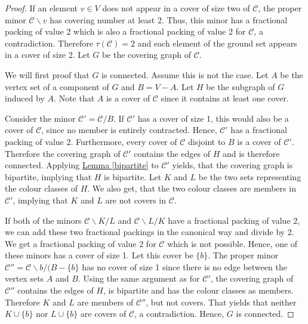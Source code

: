 \documentclass[a4paper, 12pt, twoside=false]{scrbook}
\theoremstyle{definition}
\begin{document}
   \begin{proof}
       If an element $v \in V$ does not appear in a cover of size two of $\mathcal{C}$, the proper minor $\mathcal{C} \backslash v$ has covering number at least 2.
       Thus, this minor has a fractional packing of value 2 which is also a fractional packing of value 2 for $\mathcal{C}$, a contradiction.
       Therefore $\tau(\mathcal{C}) = 2$ and each element of the ground set appears in a cover of size 2.
       Let $G$ be the covering graph of $\mathcal{C}$.

       We will first proof that $G$ is connected.
       Assume this is not the case.
       Let $A$ be the vertex set of a component of $G$ and $B = V - A$.
       Let $H$ be the subgraph of $G$ induced by $A$.
       Note that $A$ is a cover of $\mathcal{C}$ since it contains at least one cover.

       Consider the minor $\mathcal{C'}=\mathcal{C}/B$.
       If $\mathcal{C'}$ has a cover of size 1, this would also be a cover of $\mathcal{C}$, since no member is entirely contracted.
       Hence, $\mathcal{C'}$ has a fractional packing of value 2.
       Furthermore, every cover of $\mathcal{C}$ disjoint to $B$ is a cover of $\mathcal{C'}$.
       Therefore the covering graph of $\mathcal{C'}$ contains the edges of $H$ and is therefore connected.
       Applying \hyperref[bipartite]{Lemma \ref*{bipartite}} to $\mathcal{C'}$ yields, that the covering graph is bipartite, implying that $H$ is bipartite.
       Let $K$ and $L$ be the two sets representing the colour classes of $H$.
       We also get, that the two colour classes are members in $\mathcal{C'}$, implying that $K$ and $L$ are not covers in $\mathcal{C}$.

       If both of the minors $\mathcal{C} \backslash K / L$ and $\mathcal{C} \backslash L / K$ have a fractional packing of value 2, we can add these two fractional packings in the canonical way and divide by 2.
       We get a fractional packing of value 2 for $\mathcal{C}$ which is not possible.
       Hence, one of these minors has a cover of size 1.
       Let this cover be $\{b\}$.
       The proper minor $\mathcal{C''}=\mathcal{C} \backslash b / (B-\{b\}$ has no cover of size 1 since there is no edge between the vertex sets $A$ and $B$.
       Using the same argument as for $\mathcal{C'}$, the covering graph of $\mathcal{C''}$ contains the edges of $H$, is bipartite and has the colour classes as members.
       Therefore $K$ and $L$ are members of $\mathcal{C''}$, but not covers.
       That yields that neither $K \cup \{b\}$ nor $L \cup \{b\}$ are covers of $\mathcal{C}$, a contradiction.
       Hence, $G$ is connected.


\end{proof}
\end{document}

